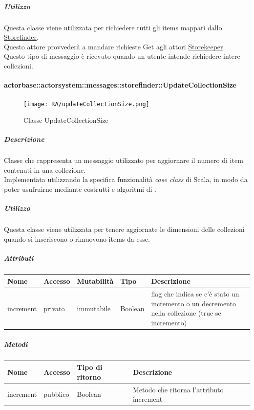 \documentclass{scalatekids-article}
\begin{document}
\subparagraph{Utilizzo}
Questa classe viene utilizzata per richiedere tutti gli items mappati dallo
\hyperref[sec:actorbase::actorsystem::actors::storefinder::Storefinder]{Storefinder}.\\Questo attore provvederà a mandare richieste Get agli attori
\hyperref[sec:actorbase::actorsystem::actors::storekeeper::Storekeeper]{Storekeeper}.\\Questo tipo di messaggio è ricevuto quando un utente intende
richiedere intere collezioni.

\paragraph{actorbase::actorsystem::messages::storefinder::UpdateCollectionSize}
\label{sec:actorbase::actorsystem::messages::storefinder::UpdateCollectionSize}

\begin{figure}[H]
  \begin{center}
    \texttt{[image: RA/updateCollectionSize.png]}
    \caption{Classe UpdateCollectionSize}
  \end{center}
\end{figure}

\subparagraph{Descrizione}
Classe che rappresenta un messaggio utilizzato per aggiornare il numero di item
contenuti in una collezione.\\Implementata utilizzando la specifica funzionalità \textit{case class} di Scala,
in modo da poter usufruirne mediante costrutti e algoritmi di
.

\subparagraph{Utilizzo}
Questa classe viene utilizzata per tenere aggiornate le dimensioni delle
collezioni quando si inseriscono o rimuovono items da esse.

\subparagraph{Attributi}
\begin{tabular}{| p{2cm} | p{1.5cm} | p{2cm} | p{3cm} | p{8.5cm} |}
  \hline
  Nome & Accesso & Mutabilità & Tipo & Descrizione\\
  \hline
  increment & privato & immutabile & Boolean & flag che indica se c'è stato un incremento o un decremento nella collezione (true se incremento)\\
  \hline
\end{tabular}

\subparagraph{Metodi}
\begin{tabular}{| l | l | l | l |}
  \hline
  Nome & Accesso & Tipo di ritorno & Descrizione\\
  \hline
  increment & pubblico & Boolean & Metodo che ritorna l'attributo increment\\
  \hline
\end{tabular}
\end{document}
